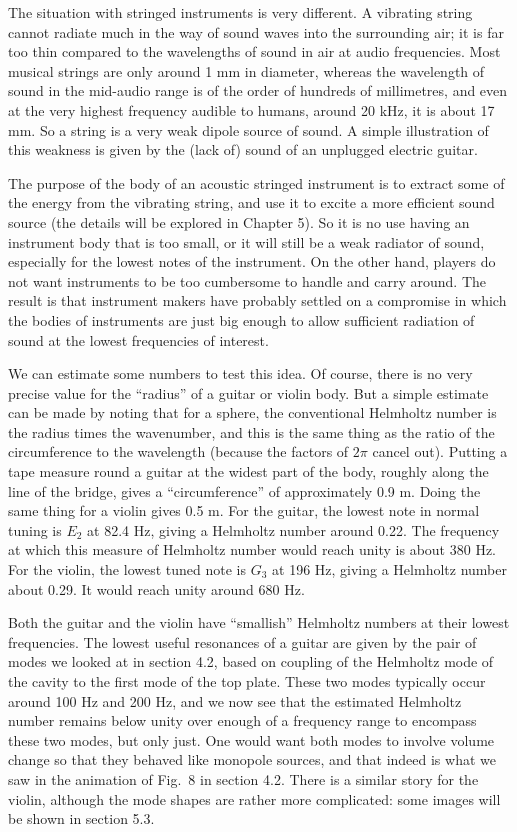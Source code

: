  The situation with stringed instruments is very different. A vibrating string 
  cannot radiate much in the way of sound waves into the surrounding air; it is 
  far too thin compared to the wavelengths of sound in air at audio 
  frequencies. Most musical strings are only around 1 mm in diameter, whereas 
  the wavelength of sound in the mid-audio range is of the order of hundreds of 
  millimetres, and even at the very highest frequency audible to humans, around 
  20 kHz, it is about 17 mm. So a string is a very weak dipole source of sound. 
  A simple illustration of this weakness is given by the (lack of) sound of an 
  unplugged electric guitar. 

  The purpose of the body of an acoustic stringed instrument is to extract some 
  of the energy from the vibrating string, and use it to excite a more 
  efficient sound source (the details will be explored in Chapter 5). So it is 
  no use having an instrument body that is too small, or it will still be a 
  weak radiator of sound, especially for the lowest notes of the instrument. On 
  the other hand, players do not want instruments to be too cumbersome to 
  handle and carry around. The result is that instrument makers have probably 
  settled on a compromise in which the bodies of instruments are just big 
  enough to allow sufficient radiation of sound at the lowest frequencies of 
  interest. 

  We can estimate some numbers to test this idea. Of course, there is no very 
  precise value for the ``radius'' of a guitar or violin body. But a simple 
  estimate can be made by noting that for a sphere, the conventional Helmholtz 
  number is the radius times the wavenumber, and this is the same thing as the 
  ratio of the circumference to the wavelength (because the factors of $2 \pi$ 
  cancel out). Putting a tape measure round a guitar at the widest part of the 
  body, roughly along the line of the bridge, gives a ``circumference'' of 
  approximately 0.9 m. Doing the same thing for a violin gives 0.5 m. For the 
  guitar, the lowest note in normal tuning is $E_2$ at 82.4 Hz, giving a 
  Helmholtz number around 0.22. The frequency at which this measure of 
  Helmholtz number would reach unity is about 380 Hz. For the violin, the 
  lowest tuned note is $G_3$ at 196 Hz, giving a Helmholtz number about 0.29. 
  It would reach unity around 680 Hz. 

  Both the guitar and the violin have ``smallish'' Helmholtz numbers at their 
  lowest frequencies. The lowest useful resonances of a guitar are given by the 
  pair of modes we looked at in section 4.2, based on coupling of the Helmholtz 
  mode of the cavity to the first mode of the top plate. These two modes 
  typically occur around 100 Hz and 200 Hz, and we now see that the estimated 
  Helmholtz number remains below unity over enough of a frequency range to 
  encompass these two modes, but only just. One would want both modes to 
  involve volume change so that they behaved like monopole sources, and that 
  indeed is what we saw in the animation of Fig.\ 8 in section 4.2. There is a 
  similar story for the violin, although the mode shapes are rather more 
  complicated: some images will be shown in section 5.3. 

